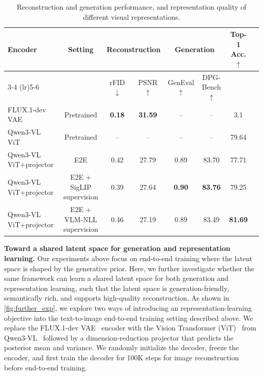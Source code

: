 \documentclass[]{bytedance_seed}
\begin{document}
\begin{table}[t]
\centering
\caption{
Reconstruction and generation performance, and representation quality of different visual representations.
}
\label{tab:und_ablation}
\setlength\tabcolsep{4pt}
\centering
\scriptsize
\begin{tabular}{lccccccc}
\toprule
 \multirow{2}{*}{Encoder} & \multirow{2}{*}{Setting} & \multicolumn{2}{c}{Reconstruction} & \multicolumn{2}{c}{Generation} & \multirow{2}{*}{Top-1 Acc.$\uparrow$} \\
 \cmidrule(lr){3-4} \cmidrule(lr){5-6} 
 & & rFID$\downarrow$ & PSNR$\uparrow$ & GenEval$\uparrow$ & DPG-Bench$\uparrow$ & \\
\midrule
FLUX.1-dev VAE & Pretrained & \textbf{0.18} & \textbf{31.59} & -- & -- & 3.1 \\
Qwen3-VL ViT & Pretrained & -- & -- & -- & -- & 79.64\\
Qwen3-VL ViT+projector & E2E & 0.42 & 27.79 & 0.89 & 83.70 & 77.71\\
Qwen3-VL ViT+projector & E2E + SigLIP supervision &  0.39 & 27.64 & \textbf{0.90} & \textbf{83.76} & 79.25\\
Qwen3-VL ViT+projector & E2E + VLM-NLL supervision & 0.46 & 	
27.19 & 0.89 & 83.49 & \textbf{81.69}\\
\bottomrule
\end{tabular}
\end{table}



\textbf{Toward a shared latent space for generation and representation learning.}
Our experiments above focus on end-to-end training where the latent space is shaped by the generative prior.
Here, we further investigate whether the same framework can learn a shared latent space for both generation and representation learning, such that the latent space is generation-friendly, semantically rich, and supports high-quality reconstruction.
As shown in \cref{fig:further_exp}, we explore two ways of introducing an representation-learning objective into the text-to-image end-to-end training setting described above.
We replace the FLUX.1-dev VAE~\cite{flux1} encoder with the Vision Transformer (ViT)~\cite{vit} from Qwen3-VL~\cite{bai2025qwen3} followed by a dimension-reduction projector that predicts the posterior mean and variance.
We randomly initialize the decoder, freeze the encoder, and first train the decoder for 100K steps for image reconstruction before end-to-end training.
\end{document}
